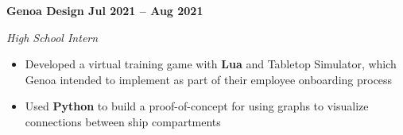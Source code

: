 \textbf{Genoa Design \hfill Jul 2021 -- Aug 2021}\par

\textit{High School Intern}
\begin{itemize}
	\item Developed a virtual training game with \textbf{Lua} and Tabletop Simulator, which Genoa intended to implement as part of their employee onboarding process
    \item Used \textbf{Python} to build a proof-of-concept for using graphs to visualize connections between ship compartments
\end{itemize}\par
